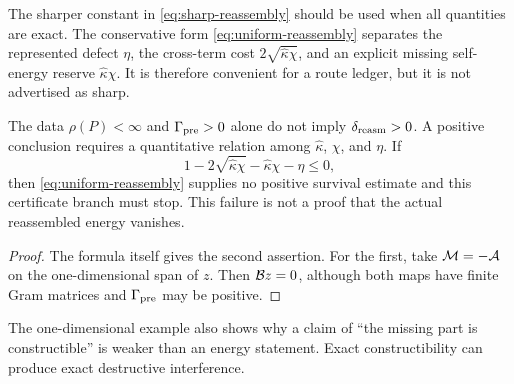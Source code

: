 \begin{remark}
The sharper constant in \eqref{eq:sharp-reassembly} should be used
when all quantities are exact.  The conservative form
\eqref{eq:uniform-reassembly} separates the represented defect
\(\eta\), the cross-term cost \(2\sqrt{\widehat\kappa\chi}\), and an
explicit missing self-energy reserve
\(\widehat\kappa\chi\).  It is therefore convenient for a route
ledger, but it is not advertised as sharp.
\end{remark}

\begin{proposition}
\label{prop:reassembly-stop}
The data \(\rho(P)<\infty\) and
\(\Gamma_{\rm pre}>0\) alone do not imply
\(\delta_{\rm reasm}>0\).  A positive conclusion requires a
quantitative relation among \(\widehat\kappa\), \(\chi\), and \(\eta\).
If
\[
 1-2\sqrt{\widehat\kappa\chi}
 -\widehat\kappa\chi-\eta\le0,
\]
then \eqref{eq:uniform-reassembly} supplies no positive survival
estimate and this certificate branch must stop.  This failure is not
a proof that the actual reassembled energy vanishes.
\end{proposition}

\begin{proof}
The formula itself gives the second assertion.  For the first, take
\(\mathcal M=-\mathcal A\) on the one-dimensional span of \(z\).  Then
\(\mathcal B z=0\), although both maps have finite Gram matrices and
\(\Gamma_{\rm pre}\) may be positive.
\end{proof}

The one-dimensional example also shows why a claim of ``the missing
part is constructible'' is weaker than an energy statement.  Exact
constructibility can produce exact destructive interference.
